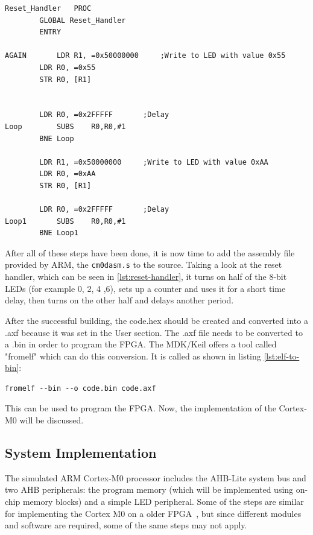 \clearpage
\begin{lstlisting}[caption={Reset Handler},label={lst:reset-handler}]
Reset_Handler	PROC
		GLOBAL Reset_Handler
		ENTRY

AGAIN		LDR	R1, =0x50000000		;Write to LED with value 0x55
		LDR	R0, =0x55
		STR	R0, [R1]


		LDR	R0, =0x2FFFFF		;Delay
Loop		SUBS	R0,R0,#1
		BNE Loop

		LDR	R1, =0x50000000		;Write to LED with value 0xAA
		LDR	R0, =0xAA
		STR	R0, [R1]

		LDR	R0, =0x2FFFFF		;Delay
Loop1		SUBS	R0,R0,#1
		BNE Loop1
\end{lstlisting}

After all of these steps have been done, it is now time to add the assembly file provided by ARM, the \verb|cm0dasm.s| to the source. Taking a look at the reset handler, which can be seen in \ref{lst:reset-handler}, it turns on half of the 8-bit LEDs (for example 0, 2, 4 ,6), sets up a counter and uses it for a short time delay, then turns on the other half and delays another period.

After the successful building, the code.hex should be created and converted into a .axf because it was set in the User section. The .axf file needs to be converted to a .bin in order to program the FPGA. The MDK/Keil offers a tool called "fromelf" which can do this conversion. It is called as shown in listing \ref{lst:elf-to-bin}:

\begin{lstlisting}[caption={Creating a bin file from ELF Format},label={lst:elf-to-bin}]
fromelf --bin --o code.bin code.axf
\end{lstlisting}

This can be used to program the FPGA. Now, the implementation of the Cortex-M0 will be discussed.

\subsection{System Implementation}

The simulated ARM Cortex-M0 processor includes the AHB-Lite system bus and two AHB peripherals: the program memory (which will be implemented using on-chip memory blocks) and a simple LED peripheral. Some of the steps are similar for implementing the Cortex M0 on a older FPGA~\cite{implementationcortexm0onnexys2}, but since different modules and software are required, some of the same steps may not apply.

